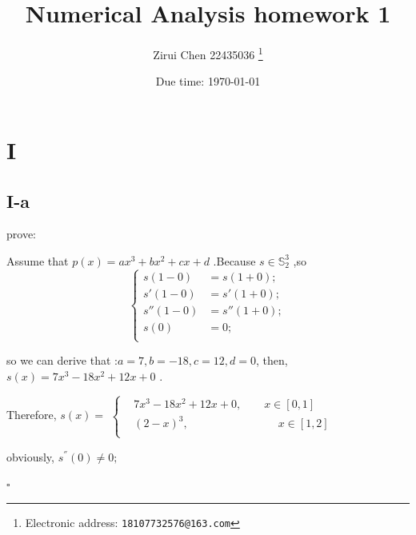 \documentclass[a4paper]{article}
\begin{document}
\title{Numerical Analysis homework 1}

\author{Zirui Chen 22435036
  \thanks{Electronic address: \texttt{18107732576@163.com}}}


\date{Due time: \today}

\maketitle






\section*{I}

\subsection*{I-a}
prove:

Assume that $p(x) = ax^{3}+bx^{2}+cx+d$ .Because $s\in \mathbb{S}_{2}^{3}$ ,so 
$$
\left\{
\begin{array}{rl}
    s(1-0) & = s(1+0); \\
    s'(1-0) & = s'(1+0); \\
    s''(1-0) & = s''(1+0); \\
    s(0) & = 0; \\
\end{array}
\right.
$$
                           
so we can derive that :$a=7,b=-18, c=12, d=0$, then, $s(x) = 7x^{3}-18x^{2}+12x+0$ .

Therefore, $s(x) = $
$
\left\{
\begin{array}{rl}
&7x^{3}-18x^{2}+12x+0 , \qquad x \in [0,1]\\
&(2-x)^{3} ,\qquad \qquad \qquad  \qquad x \in [1,2]\\
\end{array}
\right.
$

obviously, $s^{''}(0) \neq  0;$
\begin{flushright} %
    $\square$ 
\end{flushright} 
\end{document}
